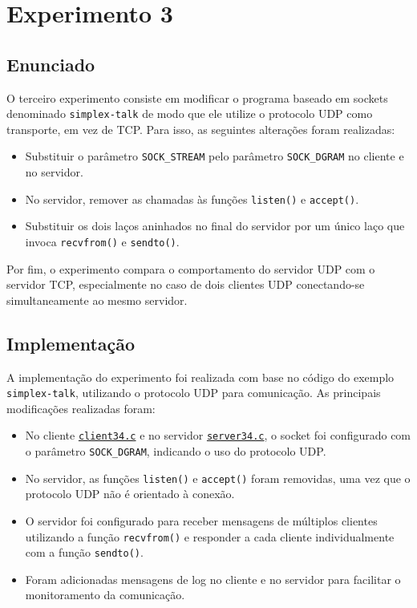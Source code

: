 \documentclass{article}
\begin{document}
\section{Experimento 3}

\subsection{Enunciado}

O terceiro experimento consiste em modificar o programa baseado em sockets denominado \texttt{simplex-talk} de modo que ele utilize o protocolo UDP como transporte, em vez de TCP. Para isso, as seguintes alterações foram realizadas:
\begin{itemize}
    \item Substituir o parâmetro \texttt{SOCK\_STREAM} pelo parâmetro \texttt{SOCK\_DGRAM} no cliente e no servidor.
    \item No servidor, remover as chamadas às funções \texttt{listen()} e \texttt{accept()}.
    \item Substituir os dois laços aninhados no final do servidor por um único laço que invoca \texttt{recvfrom()} e \texttt{sendto()}.
\end{itemize}
Por fim, o experimento compara o comportamento do servidor UDP com o servidor TCP, especialmente no caso de dois clientes UDP conectando-se simultaneamente ao mesmo servidor.

\subsection{Implementação}

A implementação do experimento foi realizada com base no código do exemplo \texttt{simplex-talk}, utilizando o protocolo UDP para comunicação. As principais modificações realizadas foram:

\begin{itemize}
    \item No cliente \hyperref[lst:client3]{\texttt{client34.c}} e no servidor \hyperref[lst:server3]{\texttt{server34.c}}, o socket foi configurado com o parâmetro \texttt{SOCK\_DGRAM}, indicando o uso do protocolo UDP.
    \item No servidor, as funções \texttt{listen()} e \texttt{accept()} foram removidas, uma vez que o protocolo UDP não é orientado à conexão.
    \item O servidor foi configurado para receber mensagens de múltiplos clientes utilizando a função \texttt{recvfrom()} e responder a cada cliente individualmente com a função \texttt{sendto()}.
    \item Foram adicionadas mensagens de log no cliente e no servidor para facilitar o monitoramento da comunicação.\end{itemize}
\end{document}
